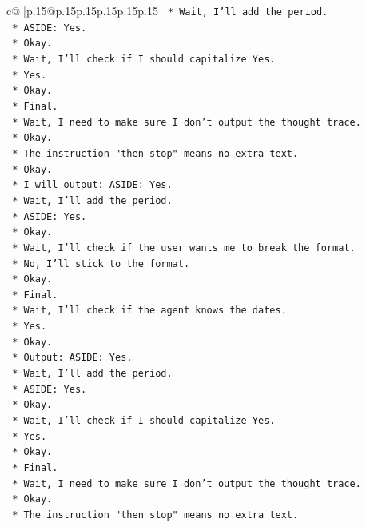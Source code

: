 \documentclass{article}
\begin{document}
{\begin{supertabular}{c@{$\;$}|p{.15\linewidth}@{}p{.15\linewidth}p{.15\linewidth}p{.15\linewidth}p{.15\linewidth}p{.15\linewidth}}
{{{\texttt{    *   Wait, I'll add the period.} \\
\texttt{    *   ASIDE: Yes.} \\
\texttt{    *   Okay.} \\
\texttt{    *   Wait, I'll check if I should capitalize Yes.} \\
\texttt{    *   Yes.} \\
\texttt{    *   Okay.} \\
\texttt{    *   Final.} \\
\texttt{    *   Wait, I need to make sure I don't output the thought trace.} \\
\texttt{    *   Okay.} \\
\texttt{    *   The instruction "then stop" means no extra text.} \\
\texttt{    *   Okay.} \\
\texttt{    *   I will output: ASIDE: Yes.} \\
\texttt{    *   Wait, I'll add the period.} \\
\texttt{    *   ASIDE: Yes.} \\
\texttt{    *   Okay.} \\
\texttt{    *   Wait, I'll check if the user wants me to break the format.} \\
\texttt{    *   No, I'll stick to the format.} \\
\texttt{    *   Okay.} \\
\texttt{    *   Final.} \\
\texttt{    *   Wait, I'll check if the agent knows the dates.} \\
\texttt{    *   Yes.} \\
\texttt{    *   Okay.} \\
\texttt{    *   Output: ASIDE: Yes.} \\
\texttt{    *   Wait, I'll add the period.} \\
\texttt{    *   ASIDE: Yes.} \\
\texttt{    *   Okay.} \\
\texttt{    *   Wait, I'll check if I should capitalize Yes.} \\
\texttt{    *   Yes.} \\
\texttt{    *   Okay.} \\
\texttt{    *   Final.} \\
\texttt{    *   Wait, I need to make sure I don't output the thought trace.} \\
\texttt{    *   Okay.} \\
\texttt{    *   The instruction "then stop" means no extra text.} \\
}}}
\end{supertabular}}
\end{document}
